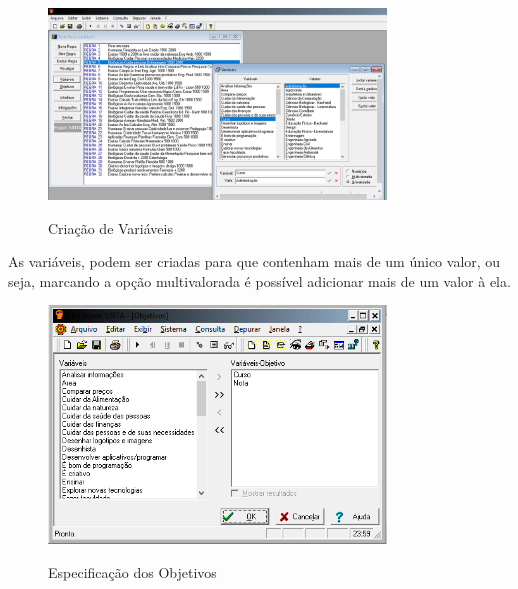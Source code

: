  
 \begin{figure}[H]
    \centering
    \caption{Criação de Variáveis}
    \includegraphics[width=0.8\textwidth]{variaveis.PNG}
    \label{variaveis}
\end{figure}
 As variáveis, podem ser criadas para que contenham mais de um único valor, ou seja, marcando a opção multivalorada é possível adicionar mais de um valor à ela.
 
 
  \begin{figure}[H]
    \centering
    \caption{Especificação dos Objetivos}
    \includegraphics[width=0.8\textwidth]{objetivos.PNG}
    \label{objetivos}
\end{figure}


